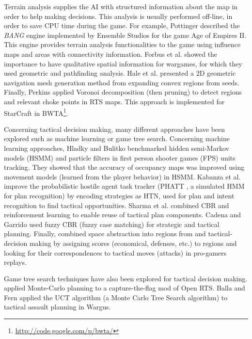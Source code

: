 \documentclass[journal]{IEEEtran}
\begin{document}
Terrain analysis supplies the AI with structured information about the map in order to help making decisions. This analysis is usually performed off-line, in order to save CPU time during the game. For example, Pottinger \cite{Pottinger00} described the \emph{BANG} engine implemented by Ensemble Studios for the game Age of Empires II. This engine provides terrain analysis functionalities to the game using influence maps and areas with connectivity information. 
Forbus et al. \cite{Forbus2002} showed the importance to have qualitative spatial information for wargames, for which they used geometric and pathfinding analysis. 
Hale et al. \cite{Hale08} presented a 2D geometric navigation mesh generation method from expanding convex regions from seeds. 
Finally, Perkins \cite{Perkins10} applied Voronoi decomposition (then pruning) %
to detect regions and relevant choke points in RTS maps. This approach is implemented for StarCraft in BWTA\footnote{\url{http://code.google.com/p/bwta/}}.

Concerning tactical decision making, many different approaches have been explored such as machine learning or game tree search. Concerning machine learning approaches, 
Hladky and Bulitko \cite{Hladky2008} benchmarked hidden semi-Markov models (HSMM) and particle filters in first person shooter games (FPS) units tracking. They showed that the accuracy of occupancy maps was improved using movement models (learned from the player behavior) in HSMM. Kabanza et al. \cite{OBRecog} improve the probabilistic hostile agent task tracker (PHATT \cite{PHATT}, a simulated HMM for plan recognition) by encoding strategies as HTN, used for plan and intent recognition to find tactical opportunities. Sharma et al. \cite{CBR-RL} combined CBR and reinforcement learning to enable reuse of tactical plan components. Cadena and Garrido \cite{CadenaG11} used fuzzy CBR (fuzzy case matching) for strategic and tactical planning. Finally, \cite{SynnaeveTactics} combined space abstraction into regions from \cite{Perkins10} and tactical-decision making by assigning scores (economical, defenses, etc.) to regions and looking for their correspondences to tactical moves (attacks) in pro-gamers replays.


Game tree search techniques have also been explored for tactical decision making. \cite{Chung05} applied Monte-Carlo planning to a capture-the-flag mod of Open RTS. Balla and Fern \cite{UCT} applied the UCT algorithm (a Monte Carlo Tree Search algorithm) to tactical assault planning in Wargus. %
\end{document}
